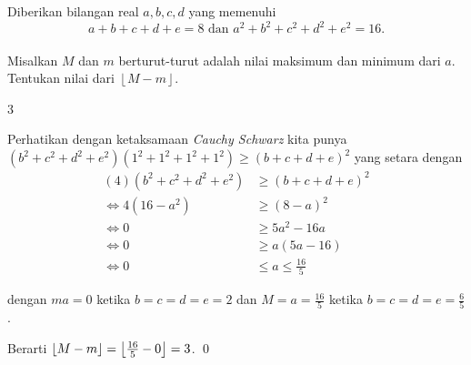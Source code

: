 \documentclass[12pt]{scrartcl}
\begin{document}
	\begin{soalbaru}
		Diberikan bilangan real $a,b,c,d$ yang memenuhi\\[-20pt] $$a+b+c+d+e=8 \text{ dan }a^2+b^2+c^2+d^2+e^2=16.$$\\[-25pt] Misalkan $M$ dan $m$ berturut-turut adalah nilai maksimum dan minimum dari $a$. Tentukan nilai dari $\left \lfloor M-m \right \rfloor$.  %
		
		\begin{jawaban}
		3
		\end{jawaban}
		\begin{solusi}
			Perhatikan dengan ketaksamaan \textit{Cauchy Schwarz} kita punya $(b^2+c^2+d^2+e^2)(1^2+1^2+1^2+1^2) \ge (b+c+d+e)^2$ yang setara dengan 
			\begin{equation*}
			\begin{split}
			(4)(b^2+c^2+d^2+e^2) &\ge (b+c+d+e)^2\\
			\iff 4(16-a^2) &\ge (8-a)^2\\
			\iff 0 &\ge 5a^2-16a\\
			\iff 0 &\ge a(5a-16)\\
			\iff 0 &\le a \le \frac{16}{5}
			\end{split}
			\end{equation*}
			
			dengan $ma=0$ ketika $b=c=d=e=2$ dan $M=a=\frac{16}{5}$ ketika $b=c=d=e=\frac{6}{5}$.
			
			Berarti $\left\lfloor M-m \right\rfloor=\left\lfloor \frac{16}{5}-0 \right\rfloor=3$. \qed
		\end{solusi}
	\end{soalbaru}
	
\end{document}
